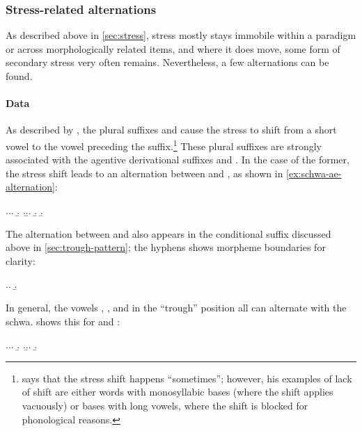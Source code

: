 \subsubsection{Stress-related alternations}
\label{sec:stress-relat-altern}

As described above in \cref{sec:stress}, stress mostly stays immobile within a paradigm or across morphologically related items, and where it does move, some form of secondary stress very often remains. Nevertheless, a few alternations can be found.

\paragraph{Data}
\label{sec:data}

As described by \citet{humphreys95:_phonol_bothoa_saint_nicol_pelem}, the plural suffixes  and  cause the stress to shift from a short vowel to the vowel preceding the suffix.\footnote{\citet[p.~247]{humphreys95:_phonol_bothoa_saint_nicol_pelem} says that the stress shift happens \enquote{sometimes}; however, his examples of lack of shift are either words with monosyllabic bases (where the shift applies vacuously) or bases with long vowels, where the shift is blocked for phonological reasons.} These plural suffixes are strongly associated with the agentive derivational suffixes  and . In the case of the former, the stress shift leads to an alternation between \ipa{[ə]} and \ipa{[æ]}, as shown in \cref{ex:schwa-ae-alternation}:

\ex.\label{ex:schwa-ae-alternation}\a.\a.
\b.
\z.\b.\a.
\b.
\b.\mbi{[ˈtoːərjən]}

The alternation between \ipa{[æ]} and \ipa{[ə]} also appears in the conditional suffix  discussed above in \cref{sec:trough-pattern}; the hyphens shows morpheme boundaries for clarity:

\ex.\a.
\b.

In general, the vowels \ipa{[æ]}, \ipa{[ɒ]}, and \ipa{[a]} in the \enquote{trough} position all can alternate with the schwa.  shows this for \ipa{[ɒ]} and \ipa{[a]}:

\ex.\label{ex:low-vowel-reduction}\a.\a.
\b.
\z.\b.\a.
\b.


